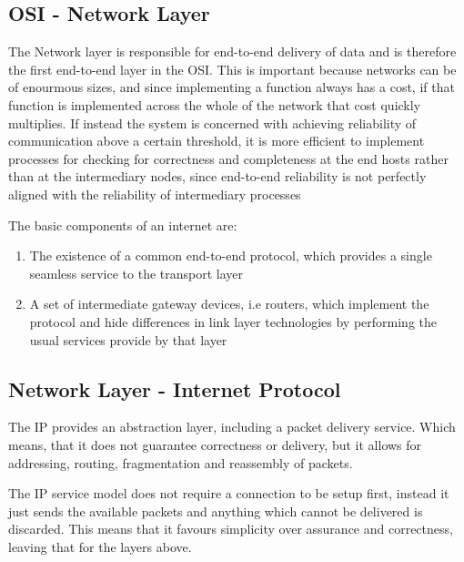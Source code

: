 \subsection{OSI - Network Layer}


	\par{The Network layer is responsible for end-to-end delivery of data and is therefore the first end-to-end layer in the OSI. This is important because networks can be of enourmous sizes, and since implementing a function always has a cost, if that function is implemented across the whole of the network that cost quickly multiplies. If instead the system is concerned with achieving reliability of communication above a certain threshold, it is more efficient to implement processes for checking for correctness and completeness at the end hosts rather than at the intermediary nodes, since end-to-end reliability is not perfectly aligned with the reliability of intermediary processes}



	\par{The basic components of an internet are:}

	\begin{enumerate}
		\item The existence of a common end-to-end protocol, which provides a single seamless service to the transport layer
		\item A set of intermediate gateway devices, i.e routers, which implement the protocol and hide differences in link layer technologies by performing the usual services provide by that layer
	\end{enumerate}

	\subsection{Network Layer - Internet Protocol}

	\par{The IP provides an abstraction layer, including a  packet delivery service. Which means, that it does not guarantee correctness or delivery, but it allows for addressing, routing, fragmentation and reassembly of packets.}
	\par{The IP service model does not require a connection to be setup first, instead it just sends the available packets and anything which cannot be delivered is discarded. This means that it favours simplicity over assurance and correctness, leaving that for the layers above.}

